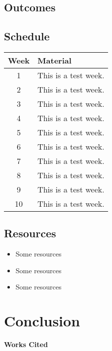 \documentclass[12pt,letterpaper]{article}
\newenvironment{workscited}{\newpage\begin{center} \large\bfseries Works Cited \end{center} \doublespacing}{\newpage}
\begin{document}
\subsection*{Outcomes}

\subsection*{Schedule}
\begin{tabular}{| c | l | }
  \hline
  \textbf{Week}  & \textbf{Material} \\ \hline
  1              & This is a test week. \\ \hline
  2              & This is a test week. \\ \hline
  3              & This is a test week. \\ \hline
  4              & This is a test week. \\ \hline
  5              & This is a test week. \\ \hline
  6              & This is a test week. \\ \hline
  7              & This is a test week. \\ \hline
  8              & This is a test week. \\ \hline
  9              & This is a test week. \\ \hline
  10             & This is a test week. \\ \hline
\end{tabular}

\subsection*{Resources}
\begin{itemize}
  \item Some resources
  \item Some resources
  \item Some resources
\end{itemize}

\section*{Conclusion}

\begin{workscited}

\end{workscited}
\end{document}
